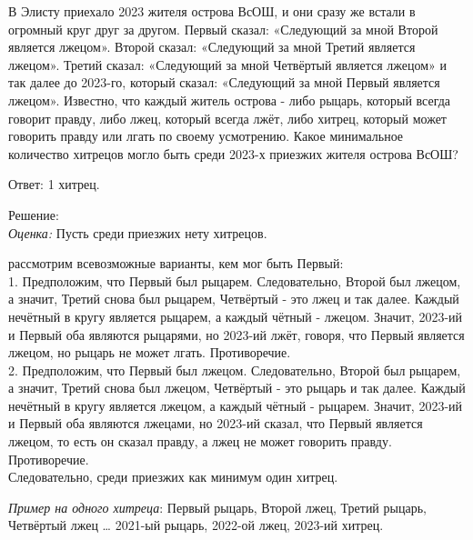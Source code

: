 \hspace{3mm}

В Элисту приехало 2023 жителя острова ВсОШ, и они сразу же встали в огромный круг друг за другом. Первый сказал: «Следующий за мной Второй является лжецом». Второй сказал: «Следующий за мной Третий является лжецом». Третий сказал: «Следующий за мной Четвёртый является лжецом» и так далее до 2023-го, который сказал: «Следующий за мной Первый является лжецом». Известно, что каждый житель острова - либо рыцарь, который всегда говорит правду, либо лжец, который всегда лжёт, либо хитрец, который может говорить правду или лгать по своему усмотрению. Какое минимальное количество хитрецов могло быть среди 2023-х приезжих жителя острова ВсОШ? 

\hspace{3mm}

Ответ: 1 хитрец.

Решение:\\
\textit{Оценка:} Пусть среди приезжих нету хитрецов.

\newpage

\hspace{3mm}

 рассмотрим всевозможные варианты, кем мог быть Первый:\\
1. Предположим, что Первый был рыцарем. Следовательно, Второй был лжецом, а значит, Третий снова был рыцарем, Четвёртый - это лжец и так далее. Каждый нечётный в кругу является рыцарем, а каждый чётный - лжецом. Значит, 2023-ий и Первый оба являются рыцарями, но 2023-ий лжёт, говоря, что Первый является лжецом, но рыцарь не может лгать. Противоречие.\\
2. Предположим, что Первый был лжецом. Следовательно, Второй был рыцарем, а значит, Третий снова был лжецом, Четвёртый - это рыцарь и так далее. Каждый нечётный в кругу является лжецом, а каждый чётный - рыцарем. Значит, 2023-ий и Первый оба являются лжецами, но 2023-ий сказал, что Первый является лжецом, то есть он сказал правду, а лжец не может говорить правду. Противоречие.\\
Следовательно, среди приезжих как минимум один хитрец.

\textit{Пример на одного хитреца}: Первый рыцарь, Второй лжец, Третий рыцарь, Четвёртый лжец … 2021-ый рыцарь, 2022-ой лжец, 2023-ий хитрец.

\hspace{3mm}

